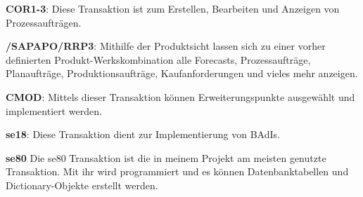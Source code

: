 \textbf{COR1-3}:
\linebreak
Diese Transaktion ist zum Erstellen, Bearbeiten und Anzeigen von Prozessaufträgen.

\textbf{/SAPAPO/RRP3}:
\linebreak
Mithilfe der Produktsicht lassen sich zu einer vorher definierten Produkt-Werkskombination alle Forecasts, Prozessaufträge, Planaufträge, Produktionsaufträge, Kaufanforderungen und vieles mehr anzeigen.

\textbf{CMOD}:
\linebreak
Mittels dieser Transaktion können Erweiterungspunkte ausgewählt und implementiert werden.

\textbf{se18}:
\linebreak
Diese Transaktion dient zur Implementierung von \ac{BAdI}s.

\textbf{se80}
\linebreak
Die se80 Transaktion ist die in meinem Projekt am meisten genutzte Transaktion. Mit ihr wird programmiert und es können Datenbanktabellen und Dictionary-Objekte erstellt werden.
